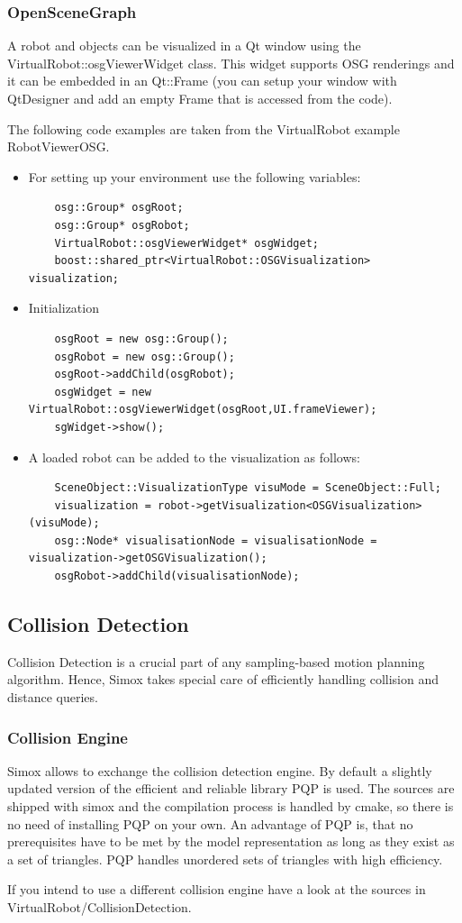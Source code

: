 \documentclass{book}
\begin{document}
\subsubsection{OpenSceneGraph}
A robot and objects can be visualized in a Qt window using the VirtualRobot::osgViewerWidget class. This widget supports OSG renderings and it can be embedded in an Qt::Frame (you can setup your window with QtDesigner and add an empty Frame that is accessed from the code).
\par
The following code examples are taken from the VirtualRobot example RobotViewerOSG. 
\begin{itemize}
\item For setting up your environment use the following variables: 
\begin{lstlisting}
    osg::Group* osgRoot;     
    osg::Group* osgRobot;
    VirtualRobot::osgViewerWidget* osgWidget;
    boost::shared_ptr<VirtualRobot::OSGVisualization> visualization;
\end{lstlisting}
\item Initialization 
\begin{lstlisting}
    osgRoot = new osg::Group();
    osgRobot = new osg::Group();
    osgRoot->addChild(osgRobot);
    osgWidget = new VirtualRobot::osgViewerWidget(osgRoot,UI.frameViewer);
    sgWidget->show();
\end{lstlisting}
\item A loaded robot can be added to the visualization as follows: 
\begin{lstlisting}
    SceneObject::VisualizationType visuMode = SceneObject::Full;
    visualization = robot->getVisualization<OSGVisualization>(visuMode);
    osg::Node* visualisationNode = visualisationNode = visualization->getOSGVisualization();
    osgRobot->addChild(visualisationNode);
\end{lstlisting}
\end{itemize}
\subsection{Collision Detection}
Collision Detection is a crucial part of any sampling-based motion planning algorithm. Hence, Simox takes special care of efficiently handling collision and distance queries. 
\par
\subsubsection{Collision Engine}
\par
Simox allows to exchange the collision detection engine. By default a slightly updated version of the efficient and reliable library PQP is used. The sources are shipped with simox and the compilation process is handled by cmake, so there is no need of installing PQP on your own. An advantage of PQP is, that no prerequisites have to be met by the model representation as long as they exist as a set of triangles. PQP handles unordered sets of triangles with high efficiency.
\par
If you intend to use a different collision engine have a look at the sources in VirtualRobot/CollisionDetection. 
\par
\end{document}
